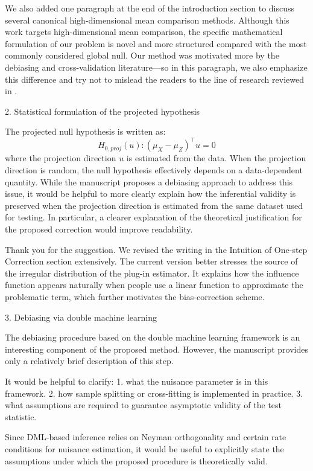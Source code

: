 \documentclass{article}
\theoremstyle{definition}
\begin{document}
We also added one paragraph at the end of the introduction section to discuss several canonical high-dimensional mean comparison methods. Although this work targets high-dimensional mean comparison, the specific mathematical formulation of our problem is novel and more structured compared with the most commonly considered global null. Our method was motivated more by the debiasing and cross-validation literature---so in this paragraph, we also emphasize this difference and try not to mislead the readers to the line of research reviewed in \cite{huang2022overview}.

\begin{shaded}
    2. Statistical formulation of the projected hypothesis

The projected null hypothesis is written as:
$$
H_{0, proj}(u): (\mu_X - \mu_Z)^\top u = 0
$$
where the projection direction $u$ is estimated from the data. When the projection direction is random, the null hypothesis effectively depends on a data-dependent quantity. While the manuscript proposes a debiasing approach to address this issue, it would be helpful to more clearly explain how the inferential validity is preserved when the projection direction is estimated from the same dataset used for testing. In particular, a clearer explanation of the theoretical justification for the proposed correction would improve readability.
\end{shaded}

Thank you for the suggestion. We revised the writing in the Intuition of One-step Correction section extensively. The current version better stresses the source of the irregular distribution of the plug-in estimator. It explains how the influence function appears naturally when people use a linear function to approximate the problematic term, which further motivates the bias-correction scheme.

\begin{shaded}
    3. Debiasing via double machine learning

The debiasing procedure based on the double machine learning framework is an interesting component of the proposed method. However, the manuscript provides only a relatively brief description of this step.

It would be helpful to clarify: 1. what the nuisance parameter is in this framework. 2. how sample splitting or cross-fitting is implemented in practice. 3. what assumptions are required to guarantee asymptotic validity of the test statistic.

Since DML-based inference relies on Neyman orthogonality and certain rate conditions for nuisance estimation, it would be useful to explicitly state the assumptions under which the proposed procedure is theoretically valid.
\end{shaded}
\end{document}
